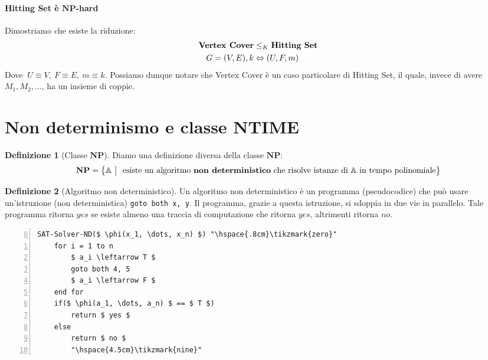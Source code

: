 \documentclass[a4paper]{article}
\theoremstyle{definition}
\newtheorem{definit}{Definizione}[subsection]
\newcommand{\np}{\mathbf{NP}}
\newcommand{\prob}[1]{\mathbb{#1}}
\newcommand{\tikzmark}[1]{\tikz[overlay,remember picture,baseline=(#1.base)]
	\node (#1) {\strut};}
\begin{document}
		\paragraph{Hitting Set è $ \np$-hard} Dimostriamo che esiste la riduzione:
			\begin{align*}
				\text{\textbf{Vertex Cover}} &\leq_K \text{\textbf{Hitting Set}} \\
				G = (V, E), k &\Leftrightarrow (U, F, m)
			\end{align*}
			Dove $\ U \equiv V,\ F \equiv E,\ m \equiv k $. Possiamo dunque notare che Vertex Cover è un caso particolare di Hitting Set, il quale, invece di avere $ M_1, M_2, \dots $, ha un insieme di coppie.
			
	\section{Non determinismo e classe NTIME}
		
		\begin{definit}[Classe $ \np $] Diamo una definizione diversa della classe $ \np $:
			\[
				\np = \big\lbrace \prob{A}\ \big|\ \text{ esiste un algoritmo \textbf{non deterministico} che risolve istanze di } \prob{A} \text{ in tempo polinomiale} \big\rbrace
			\]
		\end{definit}
		
		\begin{definit}[Algoritmo non deterministico]
			Un algoritmo non deterministico è un programma (pseudocodice) che può usare un'istruzione (non deterministica) \lstinline|goto both x, y|. Il programma, grazie a questa istruzione, si sdoppia in due vie in parallelo. Tale programma ritorna $ yes $ se esiste almeno una traccia di computazione che ritorna $ yes $, altrimenti ritorna $ no $. 
		\end{definit}
			
			\begin{lstlisting}[mathescape= true, frame=tbLr,numbers=left,	stepnumber=1, firstnumber=0, numberstyle=\ttfamily\linespread{5}, caption={Esempio di algoritmo non deterministico} ]
SAT-Solver-ND($ \phi(x_1, \dots, x_n) $) "\hspace{.8cm}\tikzmark{zero}"
	for i = 1 to n
		$ a_i \leftarrow T $
		goto both 4, 5
		$ a_i \leftarrow F $
	end for
	if($ \phi(a_1, \dots, a_n) $ == $ T $)
		return $ yes $
	else
		return $ no $ 
		"\hspace{4.5cm}\tikzmark{nine}"
			\end{lstlisting}
			
\end{document}
